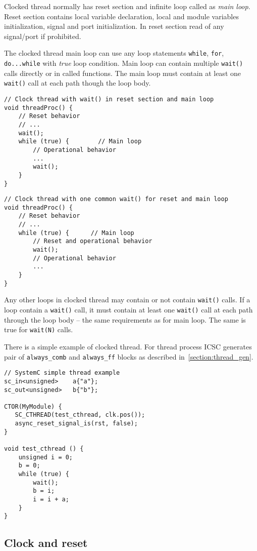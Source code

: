 Clocked thread normally has reset section and infinite loop called as \emph{main loop}. Reset section contains local variable declaration, local and module variables initialization, signal and port initialization. In reset section read of any signal/port if prohibited.

The clocked thread main loop can use any loop statements {\tt while}, {\tt for}, {\tt do...while} with \emph{true} loop condition. Main loop can contain multiple {\tt wait()} calls directly or in called functions. The main loop must contain at least one {\tt wait()} call at each path though the loop body. 
%
\begin{lstlisting}[style=mycpp]
// Clock thread with wait() in reset section and main loop
void threadProc() {
    // Reset behavior
    // ...
    wait();
    while (true) {        // Main loop
        // Operational behavior
        ...
        wait();
    }
}
\end{lstlisting}

\begin{lstlisting}[style=mycpp]
// Clock thread with one common wait() for reset and main loop
void threadProc() {
    // Reset behavior
    // ...
    while (true) {      // Main loop
        // Reset and operational behavior
        wait();
        // Operational behavior
        ...
    }
}
\end{lstlisting}

Any other loops in clocked thread may contain or not contain {\tt wait()} calls. If a loop contain a {\tt wait()} call, it must contain at least one {\tt wait()} call at each path through the loop body -- the same requirements as for main loop.
The same is true for {\tt wait(N)} calls.

There is a simple example of clocked thread. For thread process ICSC generates pair of {\tt always\_comb} and {\tt always\_ff} blocks as described in~\ref{section:thread_gen}.

\begin{lstlisting}[style=mycpp]
// SystemC simple thread example
sc_in<unsigned>    a{"a"};
sc_out<unsigned>   b{"b"};
 
CTOR(MyModule) {
   SC_CTHREAD(test_cthread, clk.pos());
   async_reset_signal_is(rst, false);
}
 
void test_cthread () {
    unsigned i = 0;
    b = 0;
    while (true) {
        wait();
        b = i;
        i = i + a;
    }
}
\end{lstlisting}

\subsection{Clock and reset}

